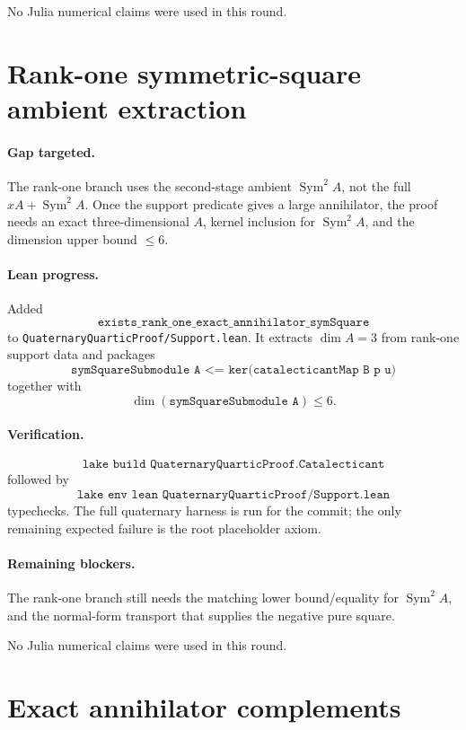 \documentclass[11pt]{article}
\begin{document}
No Julia numerical claims were used in this round.

\section*{Rank-one symmetric-square ambient extraction}

\paragraph{Gap targeted.}
The rank-one branch uses the second-stage ambient
\(\operatorname{Sym}^2 A\), not the full \(xA+\operatorname{Sym}^2A\).  Once
the support predicate gives a large annihilator, the proof needs an exact
three-dimensional \(A\), kernel inclusion for \(\operatorname{Sym}^2A\), and
the dimension upper bound \(\le6\).

\paragraph{Lean progress.}
Added
\[
\texttt{exists\_rank\_one\_exact\_annihilator\_symSquare}
\]
to \texttt{QuaternaryQuarticProof/Support.lean}.  It extracts
\(\dim A=3\) from rank-one support data and packages
\[
\texttt{symSquareSubmodule A <= ker(catalecticantMap B p u)}
\]
together with
\[
\dim(\texttt{symSquareSubmodule A})\le6.
\]

\paragraph{Verification.}
\[
\texttt{lake build QuaternaryQuarticProof.Catalecticant}
\]
followed by
\[
\texttt{lake env lean QuaternaryQuarticProof/Support.lean}
\]
typechecks.  The full quaternary harness is run for the commit; the only
remaining expected failure is the root placeholder axiom.

\paragraph{Remaining blockers.}
The rank-one branch still needs the matching lower bound/equality for
\(\operatorname{Sym}^2A\), and the normal-form transport that supplies the
negative pure square.

No Julia numerical claims were used in this round.

\section*{Exact annihilator complements}
\end{document}
